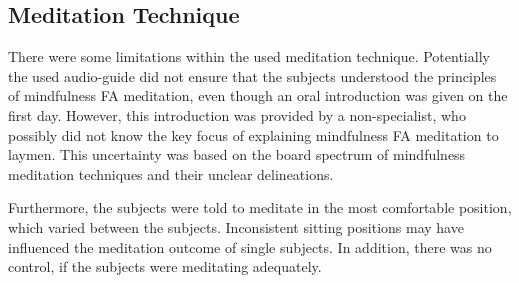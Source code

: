 \subsection{Meditation Technique}

There were some limitations within the used meditation technique. Potentially the used audio-guide did not ensure that the subjects understood the principles of mindfulness FA meditation, even though an oral introduction was given on the first day. However, this introduction was provided by a non-specialist, who possibly did not know the key focus of explaining mindfulness FA meditation to laymen. This uncertainty was based on the board spectrum of mindfulness meditation techniques and their unclear delineations. 

Furthermore, the subjects were told to meditate in the most comfortable position, which varied between the subjects. Inconsistent sitting positions may have influenced the meditation outcome of single subjects. In addition, there was no control, if the subjects were meditating adequately.

